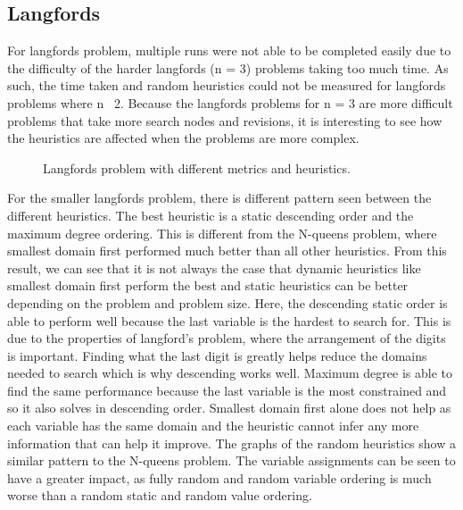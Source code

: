 \documentclass{article}
\begin{document}
\subsection{Langfords}
For langfords problem, multiple runs were not able to be completed easily due to the difficulty of the harder langfords (n = 3) problems taking too much time. As such, the time taken and random heuristics could not be measured for langfords problems where n \neq\ 2. Because the langfords problems for n = 3 are more difficult problems that take more search nodes and revisions, it is interesting to see how the heuristics are affected when the problems are more complex.  
\begin{figure}[H]
\centering
\begin{minipage}{0.45\textwidth}
\end{minipage}
%
\begin{minipage}{0.45\textwidth}
\end{minipage}
\caption{Langfords problem with different metrics and heuristics.}
\end{figure}
\noindent
For the smaller langfords problem, there is different pattern seen between the different heuristics. The best heuristic is a static descending order and the maximum degree ordering. This is different from the N-queens problem, where smallest domain first performed much better than all other heuristics. From this result, we can see that it is not always the case that dynamic heuristics like smallest domain first perform the best and static heuristics can be better depending on the problem and problem size. Here, the descending static order is able to perform well because the last variable is the hardest to search for. This is due to the properties of langford's problem, where the arrangement of the digits is important. Finding what the last digit is greatly helps reduce the domains needed to search which is why descending works well. Maximum degree is able to find the same performance because the last variable is the most constrained and so it also solves in descending order. Smallest domain first alone does not help as each variable has the same domain and the heuristic cannot infer any more information that can help it improve. 
\n
The graphs of the random heuristics show a similar pattern to the N-queens problem. The variable assignments can be seen to have a greater impact, as fully random and random variable ordering is much worse than a random static and random value ordering. 
\end{document}
